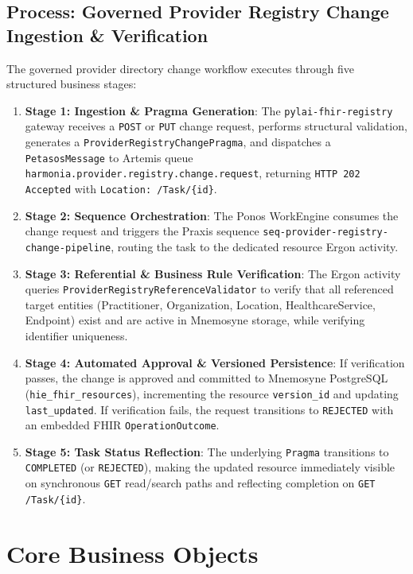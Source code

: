 \subsection{Process: Governed Provider Registry Change Ingestion \& Verification}
The governed provider directory change workflow executes through five structured business stages:
\begin{enumerate}
    \item \textbf{Stage 1: Ingestion \& Pragma Generation}: The \texttt{pylai-fhir-registry} gateway receives a \texttt{POST} or \texttt{PUT} change request, performs structural validation, generates a \texttt{ProviderRegistryChangePragma}, and dispatches a \texttt{PetasosMessage} to Artemis queue \texttt{harmonia.provider.registry.change.request}, returning \texttt{HTTP 202 Accepted} with \texttt{Location: /Task/\{id\}}.
    \item \textbf{Stage 2: Sequence Orchestration}: The Ponos WorkEngine consumes the change request and triggers the Praxis sequence \texttt{seq-provider-registry-change-pipeline}, routing the task to the dedicated resource Ergon activity.
    \item \textbf{Stage 3: Referential \& Business Rule Verification}: The Ergon activity queries \texttt{ProviderRegistryReferenceValidator} to verify that all referenced target entities (Practitioner, Organization, Location, HealthcareService, Endpoint) exist and are active in Mnemosyne storage, while verifying identifier uniqueness.
    \item \textbf{Stage 4: Automated Approval \& Versioned Persistence}: If verification passes, the change is approved and committed to Mnemosyne PostgreSQL (\texttt{hie\_fhir\_resources}), incrementing the resource \texttt{version\_id} and updating \texttt{last\_updated}. If verification fails, the request transitions to \texttt{REJECTED} with an embedded FHIR \texttt{OperationOutcome}.
    \item \textbf{Stage 5: Task Status Reflection}: The underlying \texttt{Pragma} transitions to \texttt{COMPLETED} (or \texttt{REJECTED}), making the updated resource immediately visible on synchronous \texttt{GET} read/search paths and reflecting completion on \texttt{GET /Task/\{id\}}.
\end{enumerate}

\section{Core Business Objects}

